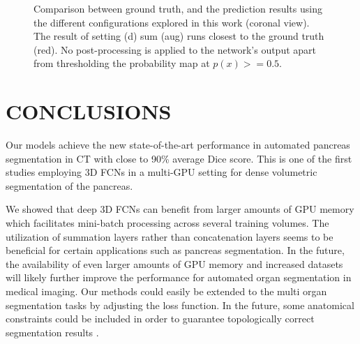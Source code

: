 \documentclass[a4paper]{spie}  %
\begin{document}
\begin{figure}[tb]
	\centering
	\hfill
	\hfill  			
	\hfill
	\vspace{1em}
	
	\hfill
	\hfill  			
	\hfill

	\vspace{1em}	
	\caption{Comparison between ground truth, and the prediction results using the different configurations explored in this work (coronal view). The result of setting (d) sum (aug) runs closest to the ground truth (red). No post-processing is applied to the network's output apart from thresholding the probability map at $p(x)>=0.5$.
	\label{fig:comparison}}
\end{figure}
\section{CONCLUSIONS}
Our models achieve the new state-of-the-art performance in automated pancreas segmentation in CT with close to 90\% average Dice score. This is one of the first studies employing 3D FCNs in a multi-GPU setting for dense volumetric segmentation of the pancreas. 

We showed that deep 3D FCNs can benefit from larger amounts of GPU memory which facilitates mini-batch processing across several training volumes. The utilization of summation layers rather than concatenation layers seems to be beneficial for certain applications such as pancreas segmentation. In the future, the availability of even larger amounts of GPU memory and increased datasets will likely further improve the performance for automated organ segmentation in medical imaging. Our methods could easily be extended to the multi organ segmentation tasks by adjusting the loss function. In the future, some anatomical constraints could be included in order to guarantee topologically correct segmentation results \cite{oktay2017anatomically}.
\acknowledgments
\end{document}
